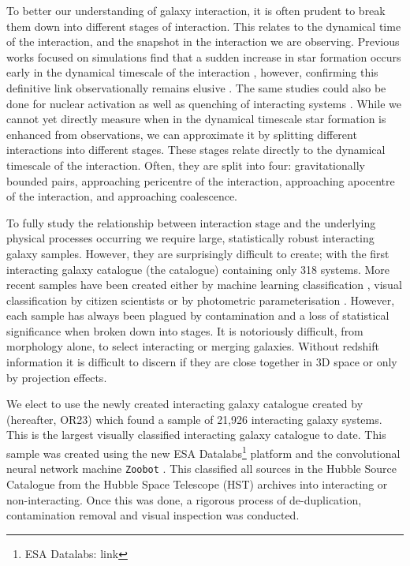 \documentclass[fleqn,usenatbib]{mnras}
\begin{document}
To better our understanding of galaxy interaction, it is often prudent to break them down into different stages of interaction. This relates to the dynamical time of the interaction, and the snapshot in the interaction we are observing. Previous works focused on simulations find that a sudden increase in star formation occurs early in the dynamical timescale of the interaction \citep{2008MNRAS.384..386C, 2019MNRAS.490.2139R}, however, confirming this definitive link observationally remains elusive \citep{2023arXiv230916531R}. The same studies could also be done for nuclear activation as well as quenching of interacting systems \citep{Papers on nuclear activation}. While we cannot yet directly measure when in the dynamical timescale star formation is enhanced from observations, we can approximate it by splitting different interactions into different stages. These stages relate directly to the dynamical timescale of the interaction. Often, they are split into four: gravitationally bounded pairs, approaching pericentre of the interaction, approaching apocentre of the interaction, and approaching coalescence.
 
To fully study the relationship between interaction stage and the underlying physical processes occurring we require large, statistically robust interacting galaxy samples. However, they are surprisingly difficult to create; with the first interacting galaxy catalogue (the \citet{1966ApJS...14....1A} catalogue) containing only 318 systems. More recent samples have been created either by machine learning classification \citep{2019A&A...626A..49P, 2023A&A...669A.141S}, visual classification by citizen scientists \citep{2010MNRAS.401.1043D} or by photometric parameterisation \citep{2004AJ....128..163L, 2023MNRAS.522....1N}. However, each sample has always been plagued by contamination and a loss of statistical significance when broken down into stages. It is notoriously difficult, from morphology alone, to select interacting or merging galaxies. Without redshift information it is difficult to discern if they are close together in 3D space or only by projection effects.
 
We elect to use the newly created interacting galaxy catalogue created by \citet{2023ApJ...948...40O} (hereafter, OR23) which found a sample of 21,926 interacting galaxy systems. This is the largest visually classified interacting galaxy catalogue to date. This sample was created using the new ESA Datalabs\footnote{ESA Datalabs: link} platform and the convolutional neural network machine 
\texttt{Zoobot} \citep{2022MNRAS.509.3966W, 2023JOSS....8.5312W}. This classified all sources in the Hubble Source Catalogue \citep{2016AJ....151..134W} from the Hubble Space Telescope (HST) archives into interacting or non-interacting. Once this was done, a rigorous process of de-duplication, contamination removal and visual inspection was conducted.
\end{document}
